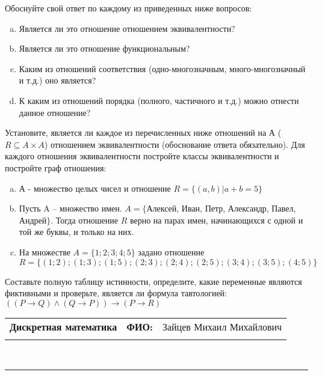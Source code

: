 \documentclass[10pt]{exam}
\newcommand{\class}{Дискретная математика}
\newcommand{\examdate}{}
\begin{document}
\begin{questions}
Обоснуйте свой ответ по каждому из приведенных ниже вопросов:
\begin{enumerate} [a)]\setcounter{enumi}{0}
    \item Является ли это отношение отношением эквивалентности?
    \item Является ли это отношение функциональным?
    \item Каким из отношений соответствия (одно-многозначным, много-многозначный и т.д.) оно является?
    \item К каким из отношений порядка (полного, частичного и т.д.) можно отнести данное отношение?
\end{enumerate}
\question
Установите, является ли каждое из перечисленных ниже отношений на А ($R \subseteq A \times A$) отношением эквивалентности (обоснование ответа обязательно). Для каждого отношения эквивалентности постройте классы 
эквивалентности и постройте граф отношения:
\begin{enumerate} [a)]\setcounter{enumi}{0}
\item А - множество целых чисел и отношение $R = \{(a,b)|a + b = 5\}$
\item Пусть A – множество имен. $A = \{ $Алексей, Иван, Петр, Александр, Павел, Андрей$ \}$. Тогда отношение $R $ верно на парах имен, начинающихся с одной и той же буквы, и только на них.
\item На множестве $A = \{1; 2; 3; 4; 5\}$ задано отношение $R = \{(1; 2); (1; 3); (1; 5); (2; 3); (2; 4); (2; 5); (3; 4); (3; 5); (4; 5)\}$
\end{enumerate}\question Составьте полную таблицу истинности, определите, какие переменные являются фиктивными и проверьте, является ли формула тавтологией:
$(( P \rightarrow Q) \land (Q \rightarrow P)) \rightarrow (P \rightarrow R)$

\end{questions}
\newpage
\begin{flushright}
\begin{tabular}{p{2.8in} r l}
\textbf{\class} & \textbf{ФИО:} &Зайцев Михаил Михайлович
\\

\textbf{\examdate} &&\\
\end{tabular}\\
\end{flushright}
\rule[1ex]{\textwidth}{.1pt}
\end{document}

